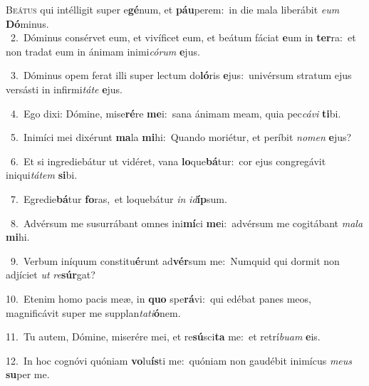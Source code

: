 \lettrine{\initial\textcolor{\initialcolor}{B}}{eátus} qui intélligit super e\-\textbf{gé}\-num, et \textbf{páu}\-perem:~\star in die mala liberábit \textit{e}\-\textit{um} \textbf{Dó}\-minus.\\
{\numbfont\textcolor{\numbcolor}{~2.}}~Dóminus consérvet eum, et vivíficet eum, et beátum fáciat \textbf{e}\-um in \textbf{ter}\-ra:~\star et non tradat eum in ánimam inimi\-\textit{có}\-\textit{rum} \textbf{e}\-jus.\par
{\numbfont\textcolor{\numbcolor}{~3.}}~Dóminus opem ferat illi super lectum do\-\textbf{ló}\-ris \textbf{e}\-jus:~\star univérsum stratum ejus versásti in infirmi\-\textit{tá}\-\textit{te} \textbf{e}\-jus.\par
{\numbfont\textcolor{\numbcolor}{~4.}}~Ego dixi: Dómine, mise\-\textbf{ré}\-re \textbf{me}\-i:~\star sana ánimam meam, quia pec\-\textit{cá}\-\textit{vi} \textbf{ti}\-bi.\par
{\numbfont\textcolor{\numbcolor}{~5.}}~Inimíci mei dixérunt \textbf{ma}\-la \textbf{mi}\-hi:~\star Quando moriétur, et períbit \textit{no}\-\textit{men} \textbf{e}\-jus?\par
{\numbfont\textcolor{\numbcolor}{~6.}}~Et si ingrediebátur ut vidéret, vana \textbf{lo}\-que\-\textbf{bá}\-tur:~\star cor ejus congregávit iniqui\-\textit{tá}\-\textit{tem} \textbf{si}\-bi.\par
{\numbfont\textcolor{\numbcolor}{~7.}}~Egredie\-\textbf{bá}\-tur \textbf{fo}\-ras,~\star et loquebátur \textit{in} \textit{id}\-\textbf{íp}sum.\par
{\numbfont\textcolor{\numbcolor}{~8.}}~Advérsum me susurrábant omnes ini\-\textbf{mí}\-ci \textbf{me}\-i:~\star advérsum me cogitábant \textit{ma}\-\textit{la} \textbf{mi}\-hi.\par
{\numbfont\textcolor{\numbcolor}{~9.}}~Verbum iníquum constitu\-\textbf{é}\-runt ad\-\textbf{vér}\-sum me:~\star Numquid qui dormit non adjíciet \textit{ut} \textit{re}\-\textbf{súr}gat?\par
{\numbfont\textcolor{\numbcolor}{10.}}~Etenim homo pacis meæ, in \textbf{quo} spe\-\textbf{rá}\-vi:~\star qui edébat panes meos, magnificávit super me supplan\-\textit{ta}\-\textit{ti}\textbf{ó}nem.\par
{\numbfont\textcolor{\numbcolor}{11.}}~Tu autem, Dómine, miserére mei, et re\-\textbf{sú}\-sci\textbf{ta} me:~\star et retrí\-\textit{bu}\-\textit{am} \textbf{e}\-is.\par
{\numbfont\textcolor{\numbcolor}{12.}}~In hoc cognóvi quóniam \textbf{vo}\-lu\-\textbf{ís}\-ti me:~\star quóniam non gaudébit inimícus \textit{me}\-\textit{us} \textbf{su}\-per me.\par
